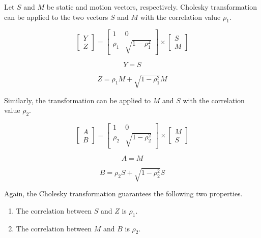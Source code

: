 Let $S$ and $M$ be static and motion vectors, respectively. Cholesky transformation can be applied to the two vectors $S$ and $M$ with the correlation value $\rho_{1}$.

\begin{equation}
\begin{bmatrix}
    Y     \\
    Z
\end{bmatrix}
=
\begin{bmatrix}
    1  & 0 \\
    \rho_{1}  & \sqrt{1-\rho_{1}^2}
\end{bmatrix}
\times
\begin{bmatrix}
    S    \\
    M
\end{bmatrix}
\end{equation}

\begin{equation}
Y = S
\end{equation}

\begin{equation}
Z = \rho_{1} M + \sqrt{1-\rho_{1}^2}M
\end{equation}

Similarly, the transformation can be applied to $M$ and $S$ with the correlation value $\rho_{2}$.


\begin{equation}
\begin{bmatrix}
    A     \\
    B
\end{bmatrix}
=
\begin{bmatrix}
    1  & 0 \\
    \rho_{2}  & \sqrt{1-\rho_{2}^2}
\end{bmatrix}
\times
\begin{bmatrix}
    M    \\
    S
\end{bmatrix}
\end{equation}

\begin{equation}
A = M
\end{equation}

\begin{equation}
B = \rho_{2} S + \sqrt{1-\rho_{2}^2}S
\end{equation}

Again, the Cholesky transformation guarantees the following two properties.


\begin{enumerate}
  \item The correlation between $S$ and $Z$ is $\rho_{1}$.
  \item The correlation between $M$ and $B$ is $\rho_{2}$.
\end{enumerate}

